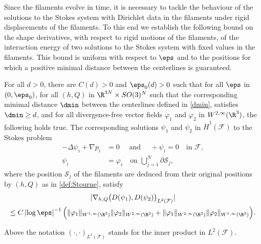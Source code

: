 Since the filaments evolve in time, it is necessary to tackle the behaviour of the solutions to the Stokes system with Dirichlet data in the filaments under rigid displacements of the filaments. To this end we establish the following bound on the shape derivatives, with respect to rigid motions of the filaments, of the interaction energy of two solutions to the Stokes system with fixed values in the filaments. This bound is uniform with respect to $\eps$ and to the positions for which a positive minimal distance between the centerlines is guaranteed.
\begin{Proposition} \label{lem:shapeDerivatives}
For all $d > 0$, there are $C(d)>0$ and $\eps_0(d)>0$ such that for all $\eps$ in $(0, \eps_0)$, for all $(h,Q) $ in $ \R^{3N} \times SO(3)^N$ such that the corresponding minimal distance $\dmin$ between the centerlines defined in \eqref{dmin}, satisfies $\dmin \geq d$,
and for all divergence-free vector fields $\varphi_1$ and $\varphi_2$
in $W^{2,\infty}(\R^3)$, the following holds true. The corresponding solutions $\psi_1$ and $\psi_2$ in $ \dot H^1(\mathcal F)$
to the Stokes problem
\begin{equation} \label{def:psi}
\begin{aligned}
- \Delta \psi_i + \nabla p_i &= 0 \quad \text{ and } \quad \div \psi_i = 0 \quad \text{in } \mathcal F, \\
\psi_i &= \varphi_i \quad \text{on } \bigcup_{j=1}^N \partial \mathcal S_j,
\end{aligned}
\end{equation}
where the position $\mathcal S_j$ of the filaments are deduced from their original positions by $(h,Q)$ as in \eqref{def:Stourne}, satisfy
\begin{multline} \label{vendred}
| \nabla_{h,Q} \big(D (\psi_1),D (\psi_2)\big)_{L^2(\mathcal F)}|
\\
\leq C \left|\log \eps\right|^{-1} \Bigl(\|\varphi_1\|_{W^{1,\infty} (\R^3) } \|\varphi_2\|_{W^{2,\infty} (\R^3)}
+
\|\varphi_1\|_{W^{2,\infty} (\R^3) } \|\varphi_2\|_{W^{1,\infty} (\R^3)}
\Bigr).
\end{multline}
\end{Proposition}
Above the notation $(\cdot, \cdot)_{L^2(\mathcal F)}$ stands for the inner product in $L^2(\mathcal F)$.
